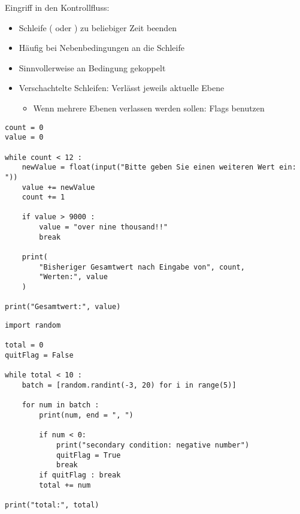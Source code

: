 \begin{frame}[fragile]{Eingriff in den Kontrollfluss: }
%
\begin{itemize}
\item Schleife (\ie {} oder ) zu beliebiger Zeit beenden
\item Häufig bei Nebenbedingungen an die Schleife
\item Sinnvollerweise an Bedingung gekoppelt\\
 \Thus {}
\item Verschachtelte Schleifen: Verlässt jeweils aktuelle Ebene
	\begin{itemize}
	\item Wenn mehrere Ebenen verlassen werden sollen: Flags benutzen
	\end{itemize}
\end{itemize}
%
\end{frame}


\begin{frame}[fragile]
\begin{codebox}
\begin{verbatim}
count = 0
value = 0

while count < 12 :
    newValue = float(input("Bitte geben Sie einen weiteren Wert ein: "))
    value += newValue
    count += 1
  
    if value > 9000 :
        value = "over nine thousand!!"
        break
  
    print(
        "Bisheriger Gesamtwert nach Eingabe von", count, 
        "Werten:", value
    )

print("Gesamtwert:", value)
\end{verbatim}
\end{codebox}
\end{frame}


\begin{frame}[fragile]
\begin{codebox}
\begin{verbatim}
import random

total = 0
quitFlag = False

while total < 10 :
    batch = [random.randint(-3, 20) for i in range(5)]
    
    for num in batch :
        print(num, end = ", ")

        if num < 0:
            print("secondary condition: negative number")
            quitFlag = True
            break
        if quitFlag : break
        total += num
    
print("total:", total)
\end{verbatim}
\end{codebox}
\end{frame}

